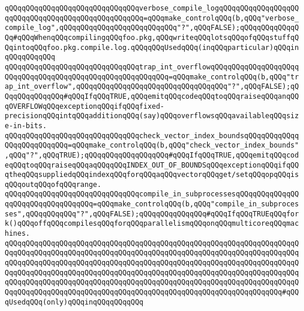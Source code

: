 \newline
\verb|qQQqqQQqqQQqqQQqqQQqqQQqqQQqqQQqverbose_compile_logqQQqqQQqqQQqqQQqqQQqqQQqqQQqqQQqqQQqqQQqqQQqqQQqqQQq=qQQqmake_controlqQQq(b,qQQq"verbose_compile_log",qQQqqQQqqQQqqQQqqQQqqQQqqQQq"?",qQQqFALSE);qQQqqQQqqQQqqQQq#qQQqWhenqQQqcompilingqQQqfoo.pkg,qQQqwriteqQQqlotsqQQqofqQQqstuffqQQqintoqQQqfoo.pkg.compile.log.qQQqqQQqUsedqQQq(inqQQqparticular)qQQqinqQQqqQQqqQQq|\newline
\newline
\verb|qQQqqQQqqQQqqQQqqQQqqQQqqQQqqQQqtrap_int_overflowqQQqqQQqqQQqqQQqqQQqqQQqqQQqqQQqqQQqqQQqqQQqqQQqqQQqqQQqqQQq=qQQqmake_controlqQQq(b,qQQq"trap_int_overflow",qQQqqQQqqQQqqQQqqQQqqQQqqQQqqQQqqQQq"?",qQQqFALSE);qQQqqQQqqQQqqQQq#qQQqIfqQQqTRUE,qQQqemitqQQqcodeqQQqtoqQQqraiseqQQqanqQQqOVERFLOWqQQqexceptionqQQqifqQQqfixed-precisionqQQqintqQQqadditionqQQq(say)qQQqoverflowsqQQqavailableqQQqsize-in-bits.|\newline
\newline
\verb|qQQqqQQqqQQqqQQqqQQqqQQqqQQqqQQqcheck_vector_index_boundsqQQqqQQqqQQqqQQqqQQqqQQqqQQq=qQQqmake_controlqQQq(b,qQQq"check_vector_index_bounds",qQQq"?",qQQqTRUE);qQQqqQQqqQQqqQQqqQQq#qQQqIfqQQqTRUE,qQQqemitqQQqcodeqQQqtoqQQqraiseqQQqaqQQqqQQqINDEX_OUT_OF_BOUNDSqQQqexceptionqQQqifqQQqtheqQQqsuppliedqQQqindexqQQqforqQQqaqQQqvectorqQQqget/setqQQqopqQQqisqQQqoutqQQqofqQQqrange.|\newline
\newline
\verb|qQQqqQQqqQQqqQQqqQQqqQQqqQQqqQQqcompile_in_subprocessesqQQqqQQqqQQqqQQqqQQqqQQqqQQqqQQqqQQq=qQQqmake_controlqQQq(b,qQQq"compile_in_subprocesses",qQQqqQQqqQQq"?",qQQqFALSE);qQQqqQQqqQQqqQQq#qQQqIfqQQqTRUEqQQqfork()qQQqoffqQQqcompilesqQQqforqQQqparallelismqQQqonqQQqmulticoreqQQqmachines.|\newline
\verb|qQQqqQQqqQQqqQQqqQQqqQQqqQQqqQQqqQQqqQQqqQQqqQQqqQQqqQQqqQQqqQQqqQQqqQQqqQQqqQQqqQQqqQQqqQQqqQQqqQQqqQQqqQQqqQQqqQQqqQQqqQQqqQQqqQQqqQQqqQQqqQQqqQQqqQQqqQQqqQQqqQQqqQQqqQQqqQQqqQQqqQQqqQQqqQQqqQQqqQQqqQQqqQQqqQQqqQQqqQQqqQQqqQQqqQQqqQQqqQQqqQQqqQQqqQQqqQQqqQQqqQQqqQQqqQQqqQQqqQQqqQQqqQQqqQQqqQQqqQQqqQQqqQQqqQQqqQQqqQQqqQQqqQQqqQQqqQQqqQQqqQQqqQQqqQQqqQQqqQQqqQQqqQQqqQQqqQQqqQQqqQQqqQQqqQQqqQQqqQQqqQQqqQQqqQQqqQQq#qQQqUsedqQQq(only)qQQqinqQQqqQQqqQQq|\newline
